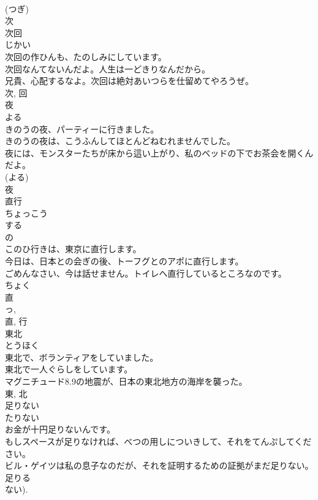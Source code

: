 \documentclass[8pt]{extreport}
\begin{document}
\begin{CJK}{UTF8}{min}
\\	(つぎ) 
\\	次	
\\	次回	
\\	じかい	
\\	次回の作ひんも、たのしみにしています。	
\\	次回なんてないんだよ。人生は一どきりなんだから。	
\\	兄貴、心配するなよ。次回は絶対あいつらを仕留めてやろうぜ。	
\\	次, 回	
\\	夜	
\\	よる	
\\	きのうの夜、パーティーに行きました。	
\\	きのうの夜は、こうふんしてほとんどねむれませんでした。	
\\	夜には、モンスターたちが床から這い上がり、私のベッドの下でお茶会を開くんだよ。	
\\	(よる) 
\\	夜	
\\	直行	
\\	ちょっこう	
\\	する 
\\	の 
\\	このひ行きは、東京に直行します。	
\\	今日は、日本との会ぎの後、トーフグとのアポに直行します。	
\\	ごめんなさい、今は話せません。トイレへ直行しているところなのです。	
\\	ちょく 
\\	直 
\\	っ, 
\\	直, 行	
\\	東北	
\\	とうほく	
\\	東北で、ボランティアをしていました。	
\\	東北で一人ぐらしをしています。	
\\	マグニチュード8.9の地震が、日本の東北地方の海岸を襲った。	
\\	東, 北	
\\	足りない	
\\	たりない	
\\	お金が十円足りないんです。	
\\	もしスペースが足りなければ、べつの用しについきして、それをてんぷしてください。	
\\	ビル・ゲイツは私の息子なのだが、それを証明するための証拠がまだ足りない。	
\\	足りる 
\\	ない). 

\end{CJK}
\end{document}

